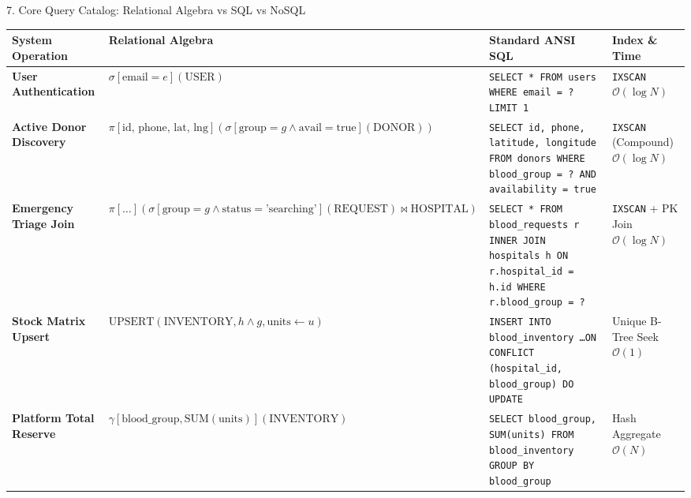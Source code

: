 \documentclass[aspectratio=169,10pt]{beamer}
\begin{document}
\begin{frame}{7. Core Query Catalog: Relational Algebra vs SQL vs NoSQL}
    \begin{table}[H]
        \centering
        \tiny
        \begin{tabular}{p{2.6cm}p{3.8cm}p{4.2cm}p{1.8cm}}
            \toprule
            \textbf{System Operation} & \textbf{Relational Algebra} & \textbf{Standard ANSI SQL} & \textbf{Index \& Time} \\
            \midrule
            \textbf{User Authentication} & $\sigma[\text{email} = e](\text{USER})$ & \texttt{SELECT * FROM users WHERE email = ? LIMIT 1} & \texttt{IXSCAN} $\mathcal{O}(\log N)$ \\[4pt]
            \textbf{Active Donor Discovery} & $\pi[\text{id, phone, lat, lng}](\sigma[\text{group}=g \land \text{avail}=\text{true}](\text{DONOR}))$ & \texttt{SELECT id, phone, latitude, longitude FROM donors WHERE blood\_group = ? AND availability = true} & \texttt{IXSCAN} (Compound) $\mathcal{O}(\log N)$ \\[4pt]
            \textbf{Emergency Triage Join} & $\pi[\dots](\sigma[\text{group}=g \land \text{status}=\text{'searching'}](\text{REQUEST}) \bowtie \text{HOSPITAL})$ & \texttt{SELECT * FROM blood\_requests r INNER JOIN hospitals h ON r.hospital\_id = h.id WHERE r.blood\_group = ?} & \texttt{IXSCAN} + PK Join $\mathcal{O}(\log N)$ \\[4pt]
            \textbf{Stock Matrix Upsert} & $\text{UPSERT}(\text{INVENTORY}, h \land g, \text{units} \leftarrow u)$ & \texttt{INSERT INTO blood\_inventory \dots ON CONFLICT (hospital\_id, blood\_group) DO UPDATE} & Unique B-Tree Seek $\mathcal{O}(1)$ \\[4pt]
            \textbf{Platform Total Reserve} & $\gamma[\text{blood\_group}, \text{SUM}(\text{units})](\text{INVENTORY})$ & \texttt{SELECT blood\_group, SUM(units) FROM blood\_inventory GROUP BY blood\_group} & Hash Aggregate $\mathcal{O}(N)$ \\
            \bottomrule
        \end{tabular}
    \end{table}
\end{frame}
\end{document}
